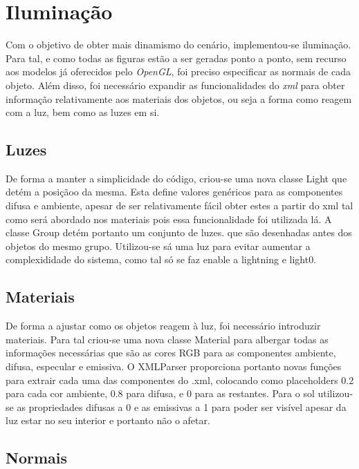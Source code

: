 \chapter{Iluminação}

Com o objetivo de obter mais dinamismo do cenário, implementou-se iluminação. Para tal, e como todas as figuras estão a ser geradas ponto a ponto, sem recurso aos modelos já oferecidos pelo \textit{OpenGL}, foi preciso especificar as normais de cada objeto. Além disso, foi necessário expandir as funcionalidades do \textit{xml} para obter informação relativamente aos materiais dos objetos, ou seja a forma como reagem com a luz, bem como as luzes em si.


\section{Luzes }

De forma a manter a simplicidade do código, criou-se uma nova classe Light que detém a posiçãoo da mesma. Esta define valores genéricos para as componentes difusa e ambiente, apesar de ser relativamente fácil obter estes a partir do xml tal como será abordado nos materiais pois essa funcionalidade foi utilizada lá.
A classe Group detém portanto um conjunto de luzes. que são desenhadas antes dos objetos do mesmo grupo. Utilizou-se sá uma luz para evitar aumentar a complexididade do sistema, como tal só se faz enable a lightning e light0.


\section{Materiais}

De forma a ajustar como os objetos reagem à luz, foi necessário introduzir materiais. Para tal criou-se uma nova classe Material para albergar todas as informações necessárias que são as cores RGB para as componentes ambiente, difusa, especular e emissiva.
O XMLParser proporciona portanto novas funções para extrair cada uma das componentes do .xml, colocando como placeholders 0.2 para cada cor ambiente, 0.8 para difusa, e 0 para as restantes. Para o sol utilizou-se as propriedades difusas a 0 e as emissivas a 1 para
poder ser visível apesar da luz estar no seu interior e portanto não o afetar.


\section{Normais}

